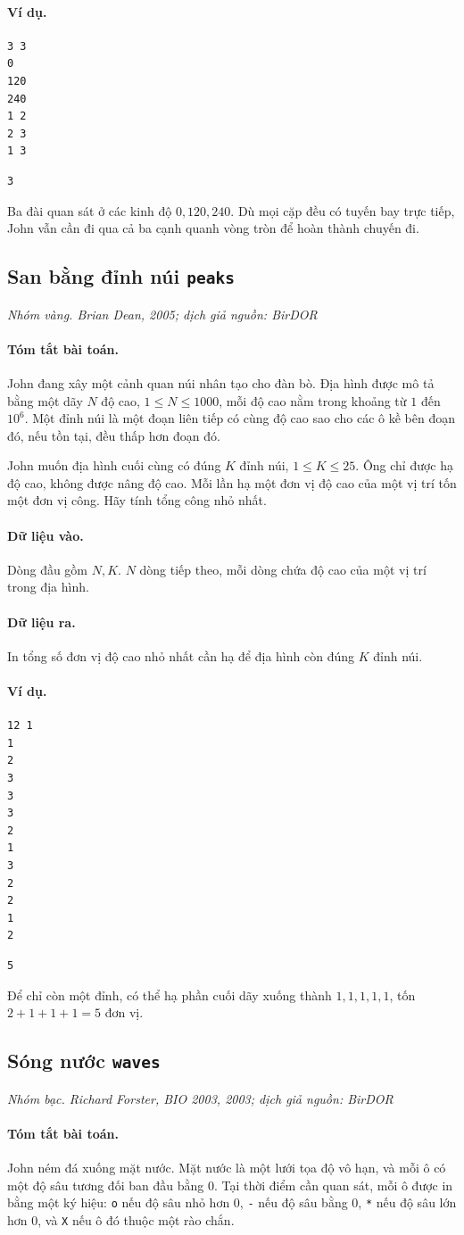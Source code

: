 \documentclass[11pt]{article}
\newcommand{\problem}[4]{%
  \subsection[#1 (#2)]{#1 \hfill {\normalsize\texttt{#2}}}%
  \noindent\textit{#3. #4}\par\smallskip
}
\newcommand{\iosec}[1]{\paragraph{#1}}
\begin{document}
\iosec{Ví dụ.}
\begin{verbatim}
3 3
0
120
240
1 2
2 3
1 3
\end{verbatim}

\begin{verbatim}
3
\end{verbatim}

Ba đài quan sát ở các kinh độ \(0,120,240\). Dù mọi cặp đều có tuyến bay trực
tiếp, John vẫn cần đi qua cả ba cạnh quanh vòng tròn để hoàn thành chuyến đi.

\problem{San bằng đỉnh núi}{peaks}{Nhóm vàng}{Brian Dean, 2005; dịch giả nguồn: BirDOR}

\iosec{Tóm tắt bài toán.}
John đang xây một cảnh quan núi nhân tạo cho đàn bò. Địa hình được mô tả bằng
một dãy \(N\) độ cao, \(1\le N\le 1000\), mỗi độ cao nằm trong khoảng từ \(1\)
đến \(10^6\). Một đỉnh núi là một đoạn liên tiếp có cùng độ cao sao cho các ô
kề bên đoạn đó, nếu tồn tại, đều thấp hơn đoạn đó.

John muốn địa hình cuối cùng có đúng \(K\) đỉnh núi, \(1\le K\le 25\). Ông
chỉ được hạ độ cao, không được nâng độ cao. Mỗi lần hạ một đơn vị độ cao của
một vị trí tốn một đơn vị công. Hãy tính tổng công nhỏ nhất.

\iosec{Dữ liệu vào.}
Dòng đầu gồm \(N,K\). \(N\) dòng tiếp theo, mỗi dòng chứa độ cao của một vị
trí trong địa hình.

\iosec{Dữ liệu ra.}
In tổng số đơn vị độ cao nhỏ nhất cần hạ để địa hình còn đúng \(K\) đỉnh núi.

\iosec{Ví dụ.}
\begin{verbatim}
12 1
1
2
3
3
3
2
1
3
2
2
1
2
\end{verbatim}

\begin{verbatim}
5
\end{verbatim}

Để chỉ còn một đỉnh, có thể hạ phần cuối dãy xuống thành
\(1,1,1,1,1\), tốn \(2+1+1+1=5\) đơn vị.

\problem{Sóng nước}{waves}{Nhóm bạc}{Richard Forster, BIO 2003, 2003; dịch giả nguồn: BirDOR}

\iosec{Tóm tắt bài toán.}
John ném đá xuống mặt nước. Mặt nước là một lưới tọa độ vô hạn, và mỗi ô có
một độ sâu tương đối ban đầu bằng \(0\). Tại thời điểm cần quan sát, mỗi ô
được in bằng một ký hiệu: \texttt{o} nếu độ sâu nhỏ hơn \(0\), \texttt{-} nếu
độ sâu bằng \(0\), \texttt{*} nếu độ sâu lớn hơn \(0\), và \texttt{X} nếu ô
đó thuộc một rào chắn.
\end{document}
